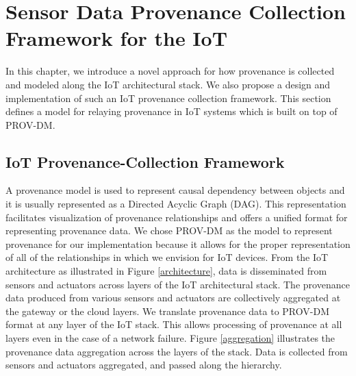 
\chapter{Sensor Data Provenance Collection Framework for the IoT}

In this chapter, we introduce a novel approach for how provenance is collected and modeled along the IoT architectural stack. We also propose a design and  implementation of such an IoT provenance collection framework. This section defines a model for relaying provenance in IoT systems which is built on top of PROV-DM. 

\section{IoT Provenance-Collection Framework }
%

A provenance model is used to represent causal dependency between objects and it is usually represented as a Directed Acyclic Graph (DAG). This representation facilitates visualization of provenance relationships and offers a unified format for representing provenance data. We chose PROV-DM as the model to represent provenance for our implementation because it allows for the proper representation of all of the relationships in which we envision for IoT devices. 
From the IoT architecture as illustrated in Figure \ref{architecture}, data is disseminated from sensors and actuators across layers of the IoT architectural stack. The provenance data produced from various sensors and actuators are collectively aggregated at the gateway or the cloud layers. We translate provenance data to PROV-DM format at any layer of the IoT stack. This allows processing of provenance at all layers even in the case of a network failure. 
 Figure \ref{aggregation} illustrates the provenance data aggregation across the layers of the stack. Data is collected from sensors and actuators aggregated, and passed along the hierarchy. 


